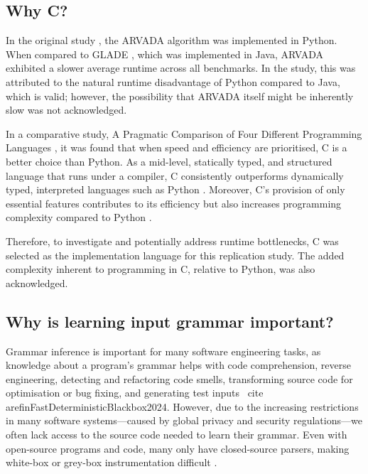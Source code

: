 \subsection{Why C?}

In the original study \cite{kulkarniLearningHighlyRecursive2021}, the ARVADA algorithm was implemented in Python. When compared to GLADE \cite{bastaniSynthesizingProgramInput}, which was implemented in Java, ARVADA exhibited a slower average runtime across all benchmarks. In the study, this was attributed to the natural runtime disadvantage of Python compared to Java, which is valid; however, the possibility that ARVADA itself might be inherently slow was not acknowledged.

\vspace{\baselineskip}

In a comparative study, A Pragmatic Comparison of Four Different Programming Languages \cite{aliPragmaticComparisonFour2021}, it was found that when speed and efficiency are prioritised, C is a better choice than Python. As a mid-level, statically typed, and structured language that runs under a compiler, C consistently outperforms dynamically typed, interpreted languages such as Python \cite{kumarPythonLanguageComparison2022}. Moreover, C’s provision of only essential features contributes to its efficiency but also increases programming complexity compared to Python \cite{aliPragmaticComparisonFour2021, kumarPythonLanguageComparison2022}.

\vspace{\baselineskip}

Therefore, to investigate and potentially address runtime bottlenecks, C was selected as the implementation language for this replication study. The added complexity inherent to programming in C, relative to Python, was also acknowledged.

\subsection{Why is learning input grammar important?}
Grammar inference is important for many software engineering tasks, as knowledge about a program's grammar helps with code comprehension, reverse engineering, detecting and refactoring code smells, transforming source code for optimisation or bug fixing, and generating test inputs \ cite {arefinFastDeterministicBlackbox2024}. However, due to the increasing restrictions in many software systems—caused by global privacy and security regulations—we often lack access to the source code needed to learn their grammar.  Even with open-source programs and code, many only have closed-source parsers, making white-box or grey-box instrumentation difficult \cite{arefinFastDeterministicBlackbox2024,liIncrementalContextfreeGrammar2024}.

